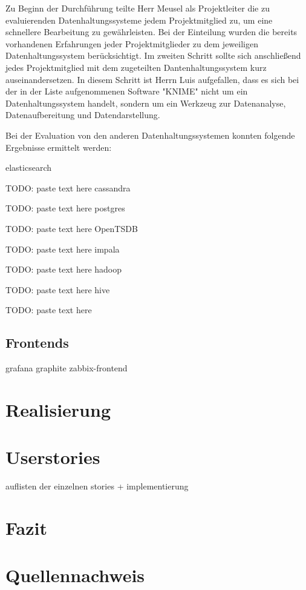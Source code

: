Zu Beginn der Durchführung teilte Herr Meusel als Projektleiter
die zu evaluierenden Datenhaltungssysteme jedem Projektmitglied zu,
um eine schnellere Bearbeitung zu gewährleisten. Bei der Einteilung
wurden die bereits vorhandenen Erfahrungen jeder Projektmitglieder zu
dem jeweiligen Datenhaltungssystem berücksichtigt. Im zweiten Schritt
sollte sich anschließend jedes Projektmitglied mit dem zugeteilten
Dantenhaltungssystem kurz auseinandersetzen. In diesem Schritt ist
Herrn Luis aufgefallen, dass es sich bei der in der Liste
aufgenommenen Software "KNIME" nicht um ein Datenhaltungssystem
handelt, sondern um ein Werkzeug zur Datenanalyse,
Datenaufbereitung und Datendarstellung.

Bei der Evaluation von den anderen Datenhaltungssystemen konnten
folgende Ergebnisse ermittelt werden: 
\begin{outline}
  \1 elasticsearch
  
  TODO: paste text here
  \1 cassandra
  
  TODO: paste text here
  \1 postgres
  
  TODO: paste text here
  \1 OpenTSDB
  
  TODO: paste text here
  \1 impala
  
  TODO: paste text here
  \1 hadoop
  
  TODO: paste text here
  \1 hive
  
  TODO: paste text here
\end{outline}
\nl%

\subsection{Frontends}

\begin{outline}
  \1 grafana
  \1 graphite
  \1 zabbix-frontend
\end{outline}

\section{Realisierung}

\section{Userstories}
auflisten der einzelnen stories + implementierung

\section{Fazit}

\section{Quellennachweis}
\printbibliography%

